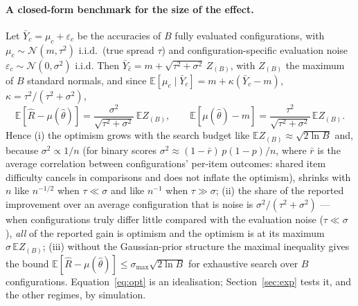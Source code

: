 \paragraph{A closed-form benchmark for the size of the effect.}
Let $\bar Y_c=\mu_c+\varepsilon_c$ be the accuracies of $B$ fully evaluated configurations, with $\mu_c\sim\mathcal N(m,\tau^2)$ i.i.d.\ (true spread $\tau$) and configuration-specific evaluation noise $\varepsilon_c\sim\mathcal N(0,\sigma^2)$ i.i.d. Then $\bar Y_{\hat c}=m+\sqrt{\tau^2+\sigma^2}\,Z_{(B)}$, with $Z_{(B)}$ the maximum of $B$ standard normals, and since $\mathbb{E}[\mu_c\mid \bar Y_c]=m+\kappa(\bar Y_c-m)$, $\kappa=\tau^2/(\tau^2+\sigma^2)$,
\begin{equation}
\mathbb{E}[\hat R-\mu(\hat\theta)]=\frac{\sigma^2}{\sqrt{\tau^2+\sigma^2}}\,\mathbb{E}Z_{(B)},\qquad
\mathbb{E}[\mu(\hat\theta)-m]=\frac{\tau^2}{\sqrt{\tau^2+\sigma^2}}\,\mathbb{E}Z_{(B)} .
\label{eq:opt}
\end{equation}
Hence (i) the optimism grows with the search budget like $\mathbb{E}Z_{(B)}\approx\sqrt{2\ln B}$ and, because $\sigma^2\propto 1/n$ (for binary scores $\sigma^2\approx(1-\bar r)\,p(1-p)/n$, where $\bar r$ is the average correlation between configurations' per-item outcomes: shared item difficulty cancels in comparisons and does not inflate the optimism), shrinks with $n$ like $n^{-1/2}$ when $\tau\ll\sigma$ and like $n^{-1}$ when $\tau\gg\sigma$; (ii) the share of the reported improvement over an average configuration that is noise is $\sigma^2/(\tau^2+\sigma^2)$ --- when configurations truly differ little compared with the evaluation noise ($\tau\ll\sigma$), \emph{all} of the reported gain is optimism and the optimism is at its maximum $\sigma\,\mathbb{E}Z_{(B)}$; (iii) without the Gaussian-prior structure the maximal inequality gives the bound $\mathbb{E}[\hat R-\mu(\hat\theta)]\le\sigma_{\max}\sqrt{2\ln B}$ for exhaustive search over $B$ configurations. Equation~\eqref{eq:opt} is an idealisation; Section~\ref{sec:exp} tests it, and the other regimes, by simulation.

